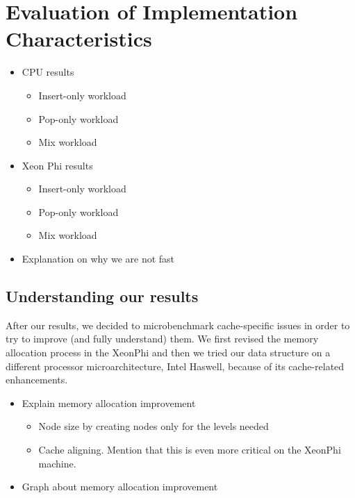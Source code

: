 \section{Evaluation of Implementation Characteristics}
\label{sec:exp}

\begin{itemize}
	\item CPU results
		\begin{itemize}
			\item Insert-only workload
			\item Pop-only workload
			\item Mix workload
		\end{itemize}
	\item Xeon Phi results
		\begin{itemize}
			\item Insert-only workload
			\item Pop-only workload
			\item Mix workload
		\end{itemize}
	\item Explanation on why we are not fast
\end{itemize}

\subsection{Understanding our results}
After our results, we decided to microbenchmark cache-specific issues in order to try to improve (and fully understand) them. We first revised the memory allocation process in the XeonPhi and then we tried our data structure on a different processor microarchitecture, Intel Haswell, because of its cache-related enhancements.

\begin{itemize}
	\item Explain memory allocation improvement
		\begin{itemize}
			\item Node size by creating nodes only for the levels needed
			\item Cache aligning. Mention that this is even more critical on the XeonPhi machine.
		\end{itemize}
	\item Graph about memory allocation improvement
\end{itemize}

